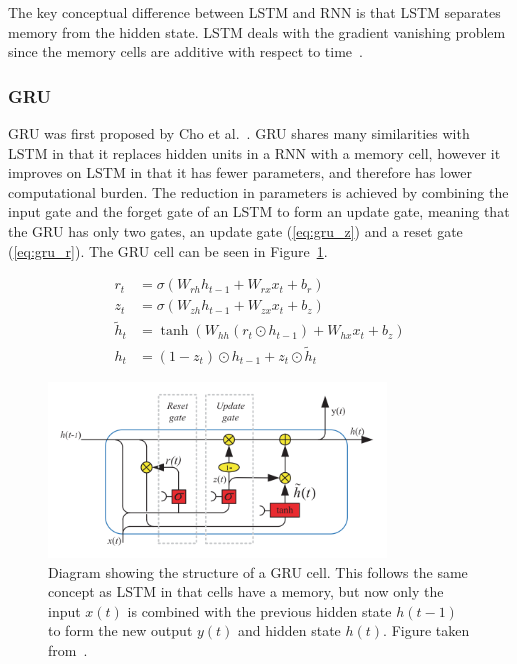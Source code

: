 The key conceptual difference between LSTM and RNN is that LSTM separates memory
from the hidden state. LSTM deals with the gradient vanishing problem since the
memory cells are additive with respect to time~\cite{daniluk2004automatic}. 

\subsubsection{GRU}

GRU was first proposed by Cho et al.~\cite{cho2014properties}. GRU shares many
similarities with LSTM in that it replaces hidden units in a RNN with a memory
cell, however it improves on LSTM in that it has fewer parameters, and therefore
has lower computational burden. The reduction in parameters is achieved by
combining the input gate and the forget gate of an LSTM to form an update gate,
meaning that the GRU has only two gates, an update gate (\ref{eq:gru_z}) and a
reset gate (\ref{eq:gru_r}). The GRU cell can be seen in
Figure~\ref{fig:gru_cell}.

\begin{align}
  r_t &= \sigma\left( W_{rh}h_{t-1} + W_{rx}x_t + b_r \right) \label{eq:gru_r} \\[0.5em]
  z_t &= \sigma\left( W_{zh}h_{t-1} + W_{zx}x_t + b_z \right) \label{eq:gru_z} \\[0.5em]
  \tilde{h}_t &= \tanh\left( W_{hh}(r_t \odot h_{t-1}) + W_{hx}x_t + b_z \right) \\[0.5em]
  h_t &= (1-z_t) \odot h_{t-1} + z_t \odot \tilde{h}_t
\end{align}

\begin{figure}[ht]
  \centering
  \includegraphics[width=0.8\textwidth]{figures/gru_cell.png}
  \caption{Diagram showing the structure of a GRU cell. This follows the same
    concept as LSTM in that cells have a memory, but now only the input $x(t)$
    is combined with the previous hidden state $h(t-1)$ to form the new output
    $y(t)$ and hidden state $h(t)$. Figure taken
  from~\cite{yu2019review}.}\label{fig:gru_cell}
\end{figure}

